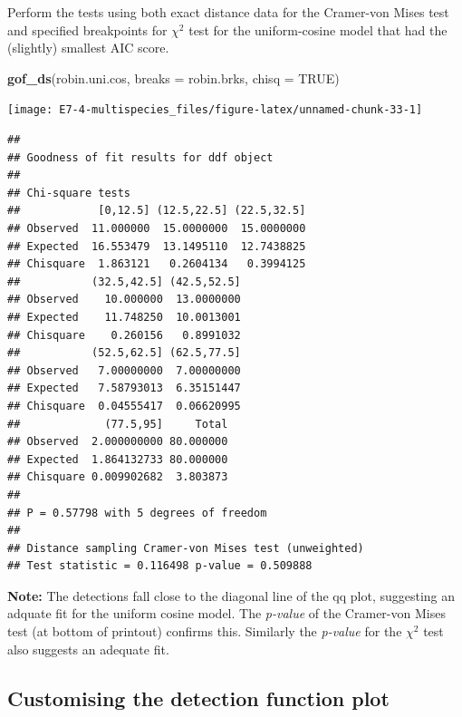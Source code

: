 \documentclass[10pt,a4paper]{tufte-handout}
\newenvironment{Shaded}{\begin{snugshade}}{\end{snugshade}}
\newcommand{\DataTypeTok}[1]{\textcolor[rgb]{0.13,0.29,0.53}{#1}}
\newcommand{\KeywordTok}[1]{\textcolor[rgb]{0.13,0.29,0.53}{\textbf{#1}}}
\newcommand{\NormalTok}[1]{#1}
\newcommand{\OtherTok}[1]{\textcolor[rgb]{0.56,0.35,0.01}{#1}}
\begin{document}
Perform the tests using both exact distance data for the Cramer-von
Mises test and specified breakpoints for \(\chi^2\) test for the
uniform-cosine model that had the (slightly) smallest AIC score.

\begin{Shaded}
\begin{Highlighting}[]
\KeywordTok{gof_ds}\NormalTok{(robin.uni.cos, }\DataTypeTok{breaks =}\NormalTok{ robin.brks, }\DataTypeTok{chisq =} \OtherTok{TRUE}\NormalTok{)}
\end{Highlighting}
\end{Shaded}

\begin{marginfigure}
\texttt{[image: E7-4-multispecies\_files/figure-latex/unnamed-chunk-33-1]} \end{marginfigure}

\begin{verbatim}
## 
## Goodness of fit results for ddf object
## 
## Chi-square tests
##            [0,12.5] (12.5,22.5] (22.5,32.5]
## Observed  11.000000  15.0000000  15.0000000
## Expected  16.553479  13.1495110  12.7438825
## Chisquare  1.863121   0.2604134   0.3994125
##           (32.5,42.5] (42.5,52.5]
## Observed    10.000000  13.0000000
## Expected    11.748250  10.0013001
## Chisquare    0.260156   0.8991032
##           (52.5,62.5] (62.5,77.5]
## Observed   7.00000000  7.00000000
## Expected   7.58793013  6.35151447
## Chisquare  0.04555417  0.06620995
##             (77.5,95]     Total
## Observed  2.000000000 80.000000
## Expected  1.864132733 80.000000
## Chisquare 0.009902682  3.803873
## 
## P = 0.57798 with 5 degrees of freedom
## 
## Distance sampling Cramer-von Mises test (unweighted)
## Test statistic = 0.116498 p-value = 0.509888
\end{verbatim}

\begin{marginfigure}
\textbf{Note:} The detections fall close to the diagonal line of the qq
plot, suggesting an adquate fit for the uniform cosine model. The
\emph{p-value} of the Cramer-von Mises test (at bottom of printout)
confirms this. Similarly the \emph{p-value} for the \(\chi^2\) test also
suggests an adequate fit.
\end{marginfigure}

\hypertarget{customising-the-detection-function-plot}{%
\subsection{Customising the detection function
plot}\label{customising-the-detection-function-plot}}
\end{document}
